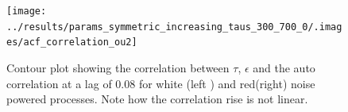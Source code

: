 \documentclass[a4paper,12pt]{book}
\theoremstyle{break}
\begin{document}
\begin{figure}[htp]
	\texttt{[image: ../results/params\_symmetric\_increasing\_taus\_300\_700\_0/.images/acf\_correlation\_ou2]}%
	\caption{Contour plot showing the correlation between $\tau$, $\epsilon$ and the auto correlation at a lag of 0.08 for white (left ) and red(right) noise powered processes. Note how the correlation rise is not linear.}%
	\label{f/a/acf_white_sym_correlation_ou2}%
\end{figure}

\appendix




\clearpage


\thispagestyle{empty}
\end{document}
